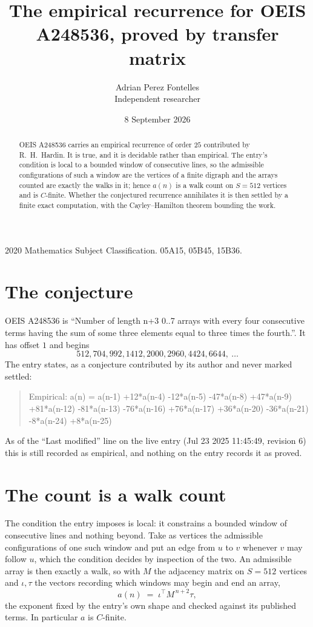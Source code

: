 \documentclass[11pt,a4paper]{article}
\title{The empirical recurrence for OEIS A248536, proved by transfer matrix}
\author{Adrian Perez Fontelles\\ \small Independent researcher}
\date{8 September 2026}
\theoremstyle{plain}
\theoremstyle{definition}
\begin{document}
\maketitle

\begin{abstract}
OEIS A248536 carries an empirical recurrence of order $25$ contributed by R.~H.~Hardin. It is
true, and it is decidable rather than empirical. The entry's condition is local to a bounded window of consecutive lines, so
the admissible configurations of such a window are the vertices of a finite digraph and the
arrays counted are exactly the walks in it; hence $a(n)$ is a walk count on $S=512$ vertices
and is $C$-finite. Whether the conjectured recurrence annihilates it is then settled by a
finite exact computation, with the Cayley--Hamilton theorem bounding the work.
\end{abstract}

\noindent\small 2020 Mathematics Subject Classification. 05A15, 05B45, 15B36.\normalsize

\section{The conjecture}

OEIS A248536 is ``Number of length n+3 0..7 arrays with every four consecutive terms having the sum of some three elements equal to three times the fourth.''. It has offset $1$ and begins
\[
512, 704, 992, 1412, 2000, 2960, 4424, 6644,\ \dots
\]
The entry states, as a conjecture contributed by its author and never marked settled:
\begin{quote}
Empirical: a(n) = a(n-1) +12*a(n-4) -12*a(n-5) -47*a(n-8) +47*a(n-9) +81*a(n-12) -81*a(n-13) -76*a(n-16) +76*a(n-17) +36*a(n-20) -36*a(n-21) -8*a(n-24) +8*a(n-25)
\end{quote}
As of the ``Last modified'' line on the live entry (Jul 23 2025 11:45:49, revision 6) this is still
recorded as empirical, and nothing on the entry records it as proved.

\section{The count is a walk count}

The condition the entry imposes is local: it constrains a bounded window of consecutive lines and nothing beyond. Take as
vertices the admissible configurations of one such window and put an edge from $u$ to $v$
whenever $v$ may follow $u$, which the condition decides by inspection of the two. An
admissible array is then exactly a walk, so with $M$ the adjacency matrix on $S=512$ vertices
and $\iota,\tau$ the vectors recording which windows may begin and end an array,
\[
a(n)\;=\;\iota^{\!\top}M^{\,n+2}\tau ,
\]
the exponent fixed by the entry's own shape and checked against its published terms. In
particular $a$ is $C$-finite.
\end{document}
